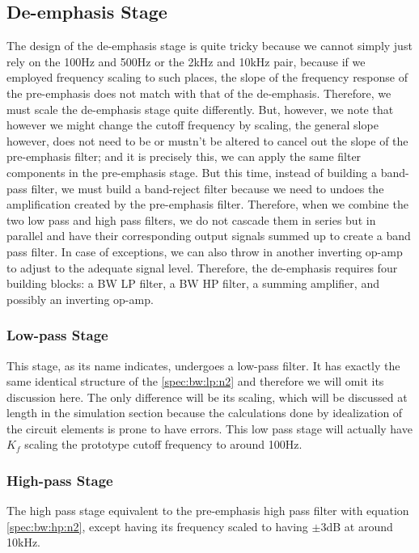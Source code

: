 \documentclass[a4paper]{IEEEtran}
\begin{document}
		\subsection{De-emphasis Stage}
			The design of the de-emphasis stage is quite tricky because we cannot simply just rely on the 100Hz and 500Hz or the 2kHz and 10kHz pair, because if we employed frequency scaling to such places, the slope of the frequency response of the pre-emphasis does not match with that of the de-emphasis. Therefore, we must scale the de-emphasis stage quite differently. But, however, we note that however we might change the cutoff frequency by scaling, the general slope however, does not need to be or mustn't be altered to cancel out the slope of the pre-emphasis filter; and it is precisely this, we can apply the same filter components in the pre-emphasis stage. But this time, instead of building a band-pass filter, we must build a band-reject filter because we need to undoes the amplification created by the pre-emphasis filter. Therefore, when we combine the two low pass and high pass filters, we do not cascade them in series but in parallel and have their corresponding output signals summed up to create a band pass filter. In case of exceptions, we can also throw in another inverting op-amp to adjust to the adequate  signal level. Therefore, the de-emphasis requires four building blocks: a BW LP filter, a BW HP filter, a summing amplifier, and possibly an inverting op-amp.
			
			\subsubsection{Low-pass Stage}
				This stage, as its name indicates, undergoes a low-pass filter. It has exactly the same identical structure of the \eqref{spec:bw:lp:n2} and therefore we will omit its discussion here. The only difference will be its scaling, which will be discussed at length in the simulation section because the calculations done by idealization of the circuit elements is prone to have errors. This low pass stage will actually have $K_f$ scaling the prototype cutoff frequency to around 100Hz.
				
			\subsubsection{High-pass Stage}
				The high pass stage equivalent to the pre-emphasis high pass filter with equation \eqref{spec:bw:hp:n2}, except having its frequency scaled to having $\pm 3$dB at around 10kHz.
			
\end{document}
